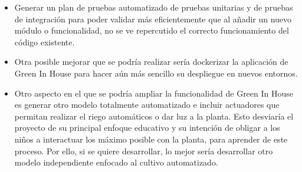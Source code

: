 \begin{itemize}
    \item Generar un plan de pruebas automatizado de pruebas unitarias y de pruebas de integración para poder validar más eficientemente que al añadir un nuevo módulo o funcionalidad, no se ve repercutido el correcto funcionamiento del código existente.
    \item Otra posible mejorar que se podría realizar sería dockerizar la aplicación de Green In House para hacer aún más sencillo su despliegue en nuevos entornos.
    \item Otro aspecto en el que se podría ampliar la funcionalidad de Green In House es generar otro modelo totalmente automatizado e incluir actuadores que permitan realizar el riego automáticos o dar luz a la planta. Esto desviaría el proyecto de su principal enfoque educativo y su intención de obligar a los niños a interactuar los máximo posible con la planta, para aprender de este proceso. Por ello, si se quiere desarrollar, lo mejor sería desarrollar otro modelo independiente enfocado al cultivo automatizado.
\end{itemize}
